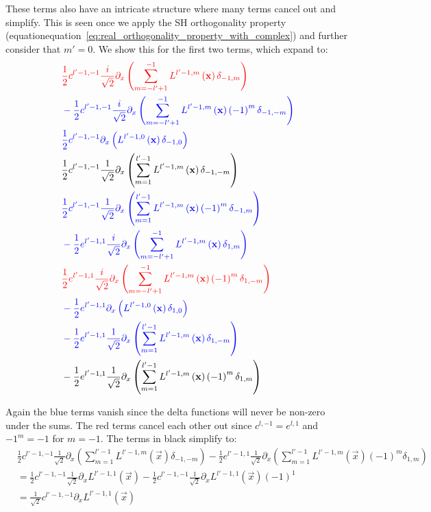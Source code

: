 These terms also have an intricate structure where many terms cancel out and simplify. This is seen once we apply the SH orthogonality property (equationequation~\ref{eq:real_orthogonality_property_with_complex}) and further consider that $m'=0$. We show this for the first two terms, which expand to:
\begin{align*}
&
\mathcolor{red}
{
\frac{1}{2}c^{{l'-1,-1}}\frac{i}{\sqrt{2}}\partial_x\left(\sum_{m=-l'+1}^{-1}{L^{{l'-1,m}}\left (\vec{x} \right )\delta_{-1,m}}\right)
}
\\&
\mathcolor{blue}
{
-\frac{1}{2}c^{{l'-1,-1}}\frac{i}{\sqrt{2}}\partial_x\left(\sum_{m=-l'+1}^{-1}{L^{{l'-1,m}}\left (\vec{x} \right )\left({-1}\right)^{m}\delta_{-1,-m}}\right)
}
\\&
\mathcolor{blue}
{
\frac{1}{2}c^{{l'-1,-1}}\partial_x\left(L^{{l'-1,0}}\left (\vec{x} \right )\delta_{-1,0}\right)
}
\\&
\frac{1}{2}c^{{l'-1,-1}}\frac{1}{\sqrt{2}}\partial_x\left(\sum_{m=1}^{l'-1}{L^{{l'-1,m}}\left (\vec{x} \right )\delta_{-1,-m}}\right)
\\&
\mathcolor{blue}
{
\frac{1}{2}c^{{l'-1,-1}}\frac{1}{\sqrt{2}}\partial_x\left(\sum_{m=1}^{l'-1}{L^{{l'-1,m}}\left (\vec{x} \right )\left({-1}\right)^{m}\delta_{-1,m}}\right)
}
\\&
\mathcolor{blue}
{
-\frac{1}{2}e^{{l'-1,1}}\frac{i}{\sqrt{2}}\partial_x\left(\sum_{m=-l'+1}^{-1}{L^{{l'-1,m}}\left (\vec{x} \right )\delta_{1,m}}\right)
}
\\&
\mathcolor{red}
{
\frac{1}{2}e^{{l'-1,1}}\frac{i}{\sqrt{2}}\partial_x\left(\sum_{m=-l'+1}^{-1}{L^{{l'-1,m}}\left (\vec{x} \right )\left({-1}\right)^{m}\delta_{1,-m}}\right)
}
\\&
\mathcolor{blue}
{
-\frac{1}{2}e^{{l'-1,1}}\partial_x\left(L^{{l'-1,0}}\left (\vec{x} \right )\delta_{1,0}\right)
}
\\&
\mathcolor{blue}
{
-\frac{1}{2}e^{{l'-1,1}}\frac{1}{\sqrt{2}}\partial_x\left(\sum_{m=1}^{l'-1}{L^{{l'-1,m}}\left (\vec{x} \right )\delta_{1,-m}}\right)
}
\\&
-\frac{1}{2}e^{{l'-1,1}}\frac{1}{\sqrt{2}}\partial_x\left(\sum_{m=1}^{l'-1}{L^{{l'-1,m}}\left (\vec{x} \right )\left({-1}\right)^{m}\delta_{1,m}}\right)
\end{align*}

Again the blue terms vanish since the delta functions will never be non-zero under the sums. The red terms cancel each other out since $c^{l,-1}=e^{l,1}$ and $-1^m=-1$ for $m=-1$. The terms in black simplify to:
\begin{align*}
&
\frac{1}{2}c^{{l'-1,-1}}\frac{1}{\sqrt{2}}\partial_x\left(\sum_{m=1}^{l'-1}{L^{{l'-1,m}}\left (\vec{x} \right )\delta_{-1,-m}}\right)
-\frac{1}{2}e^{{l'-1,1}}\frac{1}{\sqrt{2}}\partial_x\left(\sum_{m=1}^{l'-1}{L^{{l'-1,m}}\left (\vec{x} \right )\left({-1}\right)^{m}\delta_{1,m}}\right)
\\&
=
\frac{1}{2}c^{{l'-1,-1}}\frac{1}{\sqrt{2}}\partial_xL^{{l'-1,1}}\left (\vec{x} \right )
-\frac{1}{2}c^{{l'-1,-1}}\frac{1}{\sqrt{2}}\partial_xL^{{l'-1,1}}\left (\vec{x} \right )\left({-1}\right)^{1}
\\&
=
\frac{1}{\sqrt{2}}c^{{l'-1,-1}}\partial_xL^{{l'-1,1}}\left (\vec{x} \right )
\end{align*}

